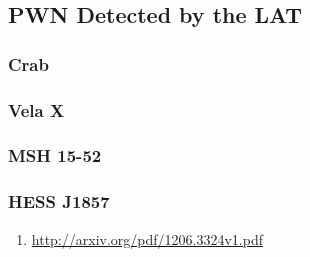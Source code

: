 \subsection{PWN Detected by the LAT}

\subsubsection{Crab}

\subsubsection{Vela X}

\subsubsection{MSH 15-52}

\subsubsection{HESS J1857}


\begin{enumerate}
  \item \url{http://arxiv.org/pdf/1206.3324v1.pdf}
\end{enumerate}
